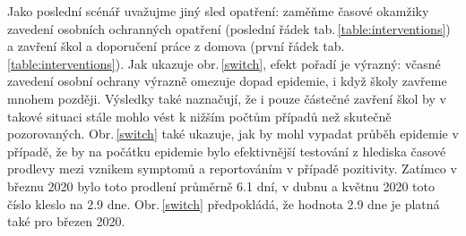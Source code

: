Jako poslední scénář uvažujme jiný sled opatření: zaměňme časové okamžiky zavedení osobních ochranných opatření (poslední řádek tab.\,\ref{table:interventions}) a zavření škol a doporučení práce z domova (první řádek tab.\,\ref{table:interventions}). Jak ukazuje obr.\,\ref{switch}, efekt pořadí je výrazný: včasné zavedení osobní ochrany výrazně omezuje dopad epidemie, i když školy zavřeme mnohem později. Výsledky také naznačují, že i pouze částečné zavření škol by v takové situaci stále mohlo vést k nižším počtům případů než skutečně pozorovaných. Obr.\,\ref{switch} také ukazuje, jak by mohl vypadat průběh epidemie v případě, že by na počátku epidemie bylo efektivnější testování z hlediska časové prodlevy mezi vznikem symptomů a reportováním v případě pozitivity. Zatímco v březnu 2020 bylo toto prodlení průměrně 6.1 dní, v dubnu a květnu 2020 toto číslo kleslo na 2.9 dne. Obr.\,\ref{switch} předpokládá, že hodnota 2.9 dne je platná také pro březen 2020.

